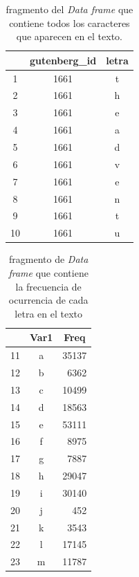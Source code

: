 \documentclass{article}
\begin{document}
\begin{table}
  \centering
  \caption{fragmento del \textit{Data frame} que contiene todos los caracteres que aparecen en el texto. }
    \begin{tabular}{ccc}
    \toprule
          & \textbf{gutenberg\_id} & \textbf{letra} \\
    \midrule
    1     & 1661  & t \\
    2     & 1661  & h \\
    3     & 1661  & e \\
    4     & 1661  & a \\
    5     & 1661  & d \\
    6     & 1661  & v \\
    7     & 1661  & e \\
    8     & 1661  & n \\
    9     & 1661  & t \\
    10    & 1661  & u \\
    \bottomrule
    \end{tabular}%
  \label{tab:1}%
\end{table}%
\begin{table}
  \centering
  \caption{fragmento de \textit{Data frame} que contiene la frecuencia de ocurrencia de cada letra en el texto}
    \begin{tabular}{ccr}
    \toprule
          & \textbf{Var1} & \multicolumn{1}{c}{\textbf{Freq}} \\
    \midrule
    11    & a     & 35137 \\
    12    & b     & 6362 \\
    13    & c     & 10499 \\
    14    & d     & 18563 \\
    15    & e     & 53111 \\
    16    & f     & 8975 \\
    17    & g     & 7887 \\
    18    & h     & 29047 \\
    19    & i     & 30140 \\
    20    & j     & 452 \\
    21    & k     & 3543 \\
    22    & l     & 17145 \\
    23    & m     & 11787 \\
    \bottomrule
    \end{tabular}%
  \label{tab:2}%
\end{table}%
\end{document}
